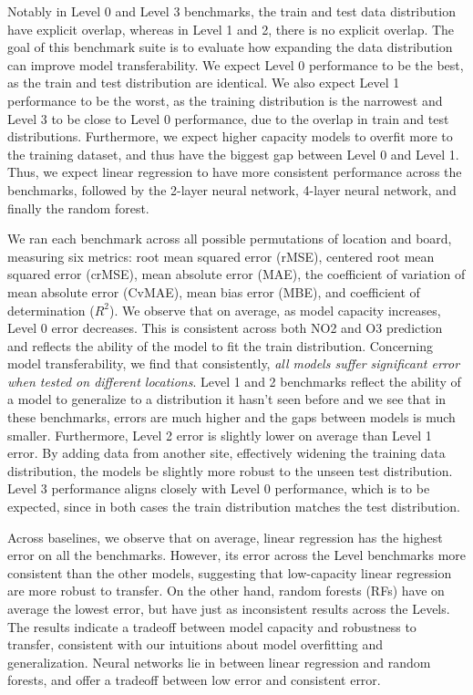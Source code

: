 \documentclass[journal abbreviation, manuscript]{copernicus}
\begin{document}
Notably in Level 0 and Level 3 benchmarks, the train and test data distribution have explicit overlap, whereas in Level 1 and 2, there is no explicit overlap. 
The goal of this benchmark suite is to evaluate how expanding the data distribution can improve model transferability. We expect Level 0 performance to be the best, as the train and test distribution are identical. We also expect Level 1 performance to be the worst, as the training distribution is the narrowest and Level 3 to be close to Level 0 performance, due to the overlap in train and test distributions. 
Furthermore, we expect higher capacity models to overfit more to the training dataset, and thus have the biggest gap between Level 0 and Level 1. Thus, we expect linear regression to have more consistent performance across the benchmarks, followed by the 2-layer neural network, 4-layer neural network, and finally the random forest.

We ran each benchmark across all possible permutations of location and board,
measuring six metrics: root mean squared error (rMSE), centered root mean squared error (crMSE), mean absolute error (MAE), the coefficient of variation of mean absolute error (CvMAE), mean bias error (MBE), and coefficient of determination ($R^2$).
We observe that on average, as model capacity increases, Level 0 error decreases. This is consistent across both NO2 and O3 prediction and reflects the ability of the model to fit the train distribution. Concerning model transferability, we find that consistently, \emph{all models suffer significant error when tested on different locations}. Level 1 and 2 benchmarks reflect the ability of a model to generalize to a distribution it hasn't seen before and we see that in these benchmarks, errors are much higher and the gaps between models is much smaller.
Furthermore, Level 2 error is slightly lower on average than Level 1 error. By adding data from another site, effectively widening the training data distribution, the models be slightly more robust to the unseen test distribution. Level 3 performance aligns closely with Level 0 performance, which is to be expected, since in both cases
the train distribution matches the test distribution.

Across baselines, we observe that on average, linear regression has the highest error on all the benchmarks. However, its error across the Level benchmarks more consistent than the other models, suggesting that low-capacity linear regression are more robust to transfer. On the other hand, random forests (RFs) have on average the lowest error, but have just as inconsistent results across the Levels. The results indicate a tradeoff between model capacity and robustness to transfer, consistent with our intuitions about model overfitting and generalization. Neural networks lie in between linear regression and random forests, and offer a tradeoff between low error and consistent error. 
\end{document}
